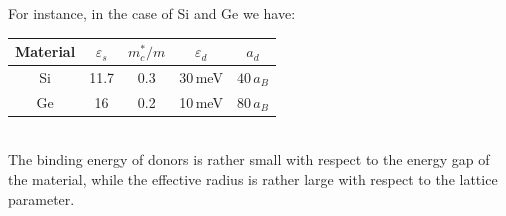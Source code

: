 \documentclass[10.75pt,a4paper,openright,bottom=2cm]{article}
\begin{document}
For instance, in the case of Si and Ge we have:
\begin{table}[h]
    \centering
    \begin{tabular}{c|cccc}
    \hline
    Material & $\varepsilon_s$ & $m_c^*/m$ & $\varepsilon_d$ & $a_d$ \\
    \hline\hline
    Si & 11.7 & 0.3 & 30\,meV & $40\,a_B$\\
    Ge & 16 & 0.2 & 10\,meV & $80\,a_B$\\
    \hline
    \end{tabular}
\end{table}\\
\noindent The binding energy of donors is rather small with respect to the energy gap of the material, while the effective radius is rather large with respect to the lattice parameter.
\end{document}
